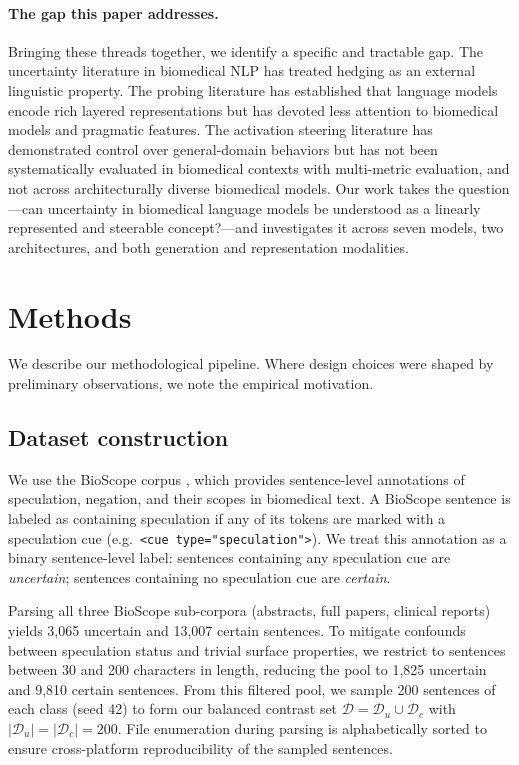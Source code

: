 \documentclass[11pt,a4paper]{article}
\begin{document}
\paragraph{The gap this paper addresses.}
Bringing these threads together, we identify a specific and tractable
gap. The uncertainty literature in biomedical NLP has treated hedging as
an external linguistic property. The probing literature has established
that language models encode rich layered representations but has devoted
less attention to biomedical models and pragmatic features. The
activation steering literature has demonstrated control over
general-domain behaviors but has not been systematically evaluated in
biomedical contexts with multi-metric evaluation, and not across
architecturally diverse biomedical models. Our work takes the
question---can uncertainty in biomedical language models be understood as
a linearly represented and steerable concept?---and investigates it
across seven models, two architectures, and both generation and
representation modalities.

\section{Methods}

We describe our methodological pipeline. Where design choices were shaped
by preliminary observations, we note the empirical motivation.

\subsection{Dataset construction}

We use the BioScope corpus \citep{vincze2008bioscope}, which provides
sentence-level annotations of speculation, negation, and their scopes in
biomedical text. A BioScope sentence is labeled as containing speculation
if any of its tokens are marked with a speculation cue
(e.g.\ \texttt{<cue type="speculation">}). We treat this annotation as a
binary sentence-level label: sentences containing any speculation cue are
\emph{uncertain}; sentences containing no speculation cue are
\emph{certain}.

Parsing all three BioScope sub-corpora (abstracts, full papers, clinical
reports) yields 3,065 uncertain and 13,007 certain sentences. To
mitigate confounds between speculation status and trivial surface
properties, we restrict to sentences between 30 and 200 characters in
length, reducing the pool to 1,825 uncertain and 9,810 certain
sentences. From this filtered pool, we sample 200 sentences of each
class (seed 42) to form our balanced contrast set
$\mathcal{D} = \mathcal{D}_u \cup \mathcal{D}_c$ with
$|\mathcal{D}_u| = |\mathcal{D}_c| = 200$. File enumeration during
parsing is alphabetically sorted to ensure cross-platform reproducibility
of the sampled sentences.
\end{document}
